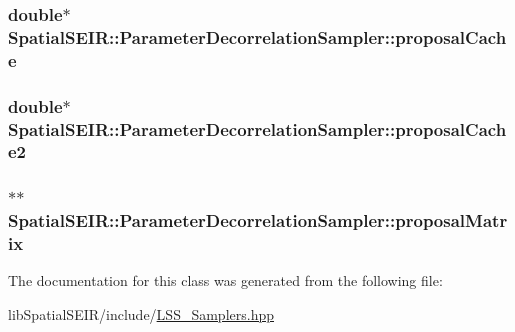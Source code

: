 \hypertarget{classSpatialSEIR_1_1ParameterDecorrelationSampler_a11fa351008038a247d6d4277a1e4dfe7}{
\subsubsection[{proposal\-Cache}]{\setlength{\rightskip}{0pt plus 5cm}double$\ast$ Spatial\-S\-E\-I\-R\-::\-Parameter\-Decorrelation\-Sampler\-::proposal\-Cache}}\label{classSpatialSEIR_1_1ParameterDecorrelationSampler_a11fa351008038a247d6d4277a1e4dfe7}
\hypertarget{classSpatialSEIR_1_1ParameterDecorrelationSampler_a4aee4558ad58aec311e280512acc8796}{
\subsubsection[{proposal\-Cache2}]{\setlength{\rightskip}{0pt plus 5cm}double$\ast$ Spatial\-S\-E\-I\-R\-::\-Parameter\-Decorrelation\-Sampler\-::proposal\-Cache2}}\label{classSpatialSEIR_1_1ParameterDecorrelationSampler_a4aee4558ad58aec311e280512acc8796}
\hypertarget{classSpatialSEIR_1_1ParameterDecorrelationSampler_afacba79f68960c5f287fe7551d39cb28}{
\subsubsection[{proposal\-Matrix}]{$\ast$$\ast$ Spatial\-S\-E\-I\-R\-::\-Parameter\-Decorrelation\-Sampler\-::proposal\-Matrix}}\label{classSpatialSEIR_1_1ParameterDecorrelationSampler_afacba79f68960c5f287fe7551d39cb28}


The documentation for this class was generated from the following file\-:\begin{DoxyCompactItemize}
\item 
lib\-Spatial\-S\-E\-I\-R/include/\hyperlink{LSS__Samplers_8hpp}{L\-S\-S\-\_\-\-Samplers.\-hpp}\end{DoxyCompactItemize}
